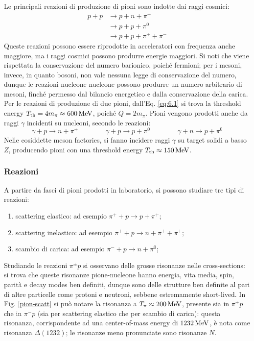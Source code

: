 Le principali reazioni di produzione di pioni sono indotte dai raggi cosmici:
\begin{equation*}
	\begin{split}
		p + p
		&\rightarrow p + n + \pi^+ \\
		&\rightarrow p + p + \pi^0 \\
		&\rightarrow p + p + \pi^+ + \pi^-
	\end{split}
\end{equation*}
Queste reazioni possono essere riprodotte in acceleratori con frequenza anche maggiore, ma i raggi cosmici possono produrre energie maggiori. Si noti che viene rispettata la conservazione del numero barionico, poiché fermioni; per i mesoni, invece, in quanto bosoni, non vale nessuna legge di conservazione del numero, dunque le reazioni nucleone-nucleone possono produrre un numero arbitrario di mesoni, finché permesso dal bilancio energetico e dalla conservazione della carica.\\
Per le reazioni di produzione di due pioni, dall'Eq. \ref{eq:6.1} si trova la threshold energy $ T_{\text{th}} = 4m_{\pi} \approx 600\,\mathrm{MeV} $, poiché $ Q = 2m_{\pi} $. Pioni vengono prodotti anche da raggi $ \gamma $ incidenti su nucleoni, secondo le reazioni:
\begin{equation*}
	\gamma + p \rightarrow n + \pi^+
	\qquad \qquad
	\gamma + p \rightarrow p + \pi^0
	\qquad \qquad
	\gamma + n \rightarrow p + \pi^0
\end{equation*}
Nelle cosiddette meson factories, si fanno incidere raggi $ \gamma $ su target solidi a basso $ Z $, producendo pioni con una threshold energy $ T_{\text{th}} \approx 150\,\mathrm{MeV} $.

\subsubsection{Reazioni}

A partire da fasci di pioni prodotti in laboratorio, si possono studiare tre tipi di reazioni:
\begin{enumerate}
	\item scattering elastico: ad esempio $ \pi^+ + p \rightarrow p + \pi^+ $;
	\item scattering inelastico: ad esempio $ \pi^+ + p \rightarrow n + \pi^+ + \pi^+ $;
	\item scambio di carica: ad esempio $ \pi^- + p \rightarrow n + \pi^0 $;
\end{enumerate}
Studiando le reazioni $ \pi^{\pm} p $ si osservano delle grosse risonanze nelle cross-sections: si trova che queste risonanze pione-nucleone hanno energia, vita media, spin, parità e decay modes ben definiti, dunque sono delle strutture ben definite al pari di altre particelle come protoni e neutroni, sebbene estremamente short-lived.
In Fig. \ref{pion-scatt} si può notare la risonanza a $ T_{\pi} \approx 200\,\mathrm{MeV} $, presente sia in $ \pi^+ p $ che in $ \pi^- p $ (sia per scattering elastico che per scambio di carica): questa risonanza, corrispondente ad una center-of-mass energy di $ 1232\,\mathrm{MeV} $, è nota come risonanza $ \Delta(1232) $; le risonanze meno pronunciate sono risonanze $ N $.

